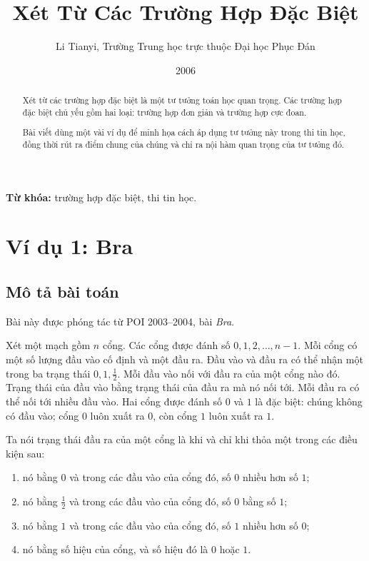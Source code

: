 \documentclass[11pt]{article}
\title{Xét Từ Các Trường Hợp Đặc Biệt}
\author{Li Tianyi, Trường Trung học trực thuộc Đại học Phục Đán}
\date{2006}
\begin{document}
\maketitle


\begin{abstract}
Xét từ các trường hợp đặc biệt là một tư tưởng toán học quan trọng. Các trường
hợp đặc biệt chủ yếu gồm hai loại: trường hợp đơn giản và trường hợp cực đoan.

Bài viết dùng một vài ví dụ để minh họa cách áp dụng tư tưởng này trong thi
tin học, đồng thời rút ra điểm chung của chúng và chỉ ra nội hàm quan trọng
của tư tưởng đó.
\end{abstract}

\noindent\textbf{Từ khóa:} trường hợp đặc biệt, thi tin học.

\tableofcontents

\section{Ví dụ 1: Bra}

\subsection{Mô tả bài toán}

Bài này được phóng tác từ POI 2003--2004, bài \textit{Bra}.

Xét một mạch gồm \(n\) cổng. Các cổng được đánh số
\(0,1,2,\ldots,n-1\). Mỗi cổng có một số lượng đầu vào cố định và một đầu ra.
Đầu vào và đầu ra có thể nhận một trong ba trạng thái \(0,1,\frac12\). Mỗi đầu
vào nối với đầu ra của một cổng nào đó. Trạng thái của đầu vào bằng trạng thái
của đầu ra mà nó nối tới. Mỗi đầu ra có thể nối tới nhiều đầu vào. Hai cổng
được đánh số \(0\) và \(1\) là đặc biệt: chúng không có đầu vào; cổng \(0\)
luôn xuất ra \(0\), còn cổng \(1\) luôn xuất ra \(1\).

Ta nói trạng thái đầu ra của một cổng là  khi và chỉ khi thỏa một
trong các điều kiện sau:
\begin{enumerate}
  \item nó bằng \(0\) và trong các đầu vào của cổng đó, số \(0\) nhiều hơn số
  \(1\);
  \item nó bằng \(\frac12\) và trong các đầu vào của cổng đó, số \(0\) bằng số
  \(1\);
  \item nó bằng \(1\) và trong các đầu vào của cổng đó, số \(1\) nhiều hơn số
  \(0\);
  \item nó bằng số hiệu của cổng, và số hiệu đó là \(0\) hoặc \(1\).
\end{enumerate}
\end{document}
